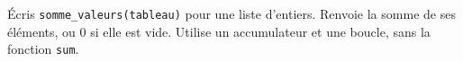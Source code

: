 Écris \texttt{somme\_valeurs(tableau)} pour une liste d'entiers. Renvoie la somme de ses éléments, ou $0$ si elle est vide. Utilise un accumulateur et une boucle, sans la fonction \texttt{sum}.
